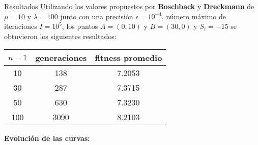 \documentclass[10pt, letterpaper]{article}
\theoremstyle{definition}
\begin{document}
\begin{section}{Resultados}
    Utilizando los valores propuestos por \textbf{Boschback} y \textbf{Dreckmann}
    de $\mu=10$ y $\lambda=100$ junto con una precisión $\epsilon=10^{-4}$,
    número máximo de iteraciones $I=10^5$, los puntos $A=(0, 10)$ y $B=(30, 0)$
    y $S_i = -15$ se obtuvieron los siguientes resultados:

    \begin{center} \begin{tabular}{ |c|c|c| }
        \hline
        $n - 1$ & generaciones & fitness promedio \\
        \hline
        10  & 138 & 7.2053 \\
        30  & 287 & 7.3715 \\
        50  & 630 & 7.3230 \\
        100  & 3090 & 8.2103 \\
        \hline
    \end{tabular} \end{center}

    \textbf{Evolución de las curvas:}
\end{section}
\end{document}
